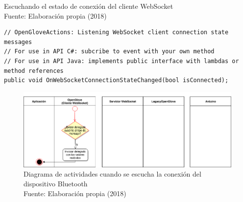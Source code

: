 \begin{algorithm}[!ht]
  \begin{center}
   	\captionsetup{justification=centering}
    \caption[Escuchando el estado de conexión del cliente WebSocket]{Escuchando el estado de conexión del cliente WebSocket\\ \tab[4cm] Fuente: Elaboración propia (2018)}
    \label{fig:methods-6-listening-websocket-state}
  \end{center}
  \begin{lstlisting}
// OpenGloveActions: Listening WebSocket client connection state messages
// For use in API C#: subcribe to event with your own method
// For use in API Java: implements public interface with lambdas or method references
public void OnWebSocketConnectionStateChanged(bool isConnected);
\end{lstlisting}
\end{algorithm}


\begin{figure}[H]
  \begin{center} 
   	\includegraphics[width=1.0\textwidth]{images/chapter04/ActivityDiagrams-ListeningFromWebSocketClient.png} 
   	\captionsetup{justification=centering}
    \caption[Diagrama de actividades cuando se escucha la conexión del dispositivo Bluetooth]{Diagrama de actividades cuando se escucha la conexión del dispositivo Bluetooth\\Fuente: Elaboración propia (2018)}
    \label{fig:activity-diagrams-6-listening-websocket-state}
  \end{center}
\end{figure}